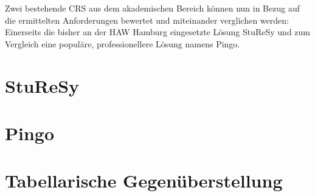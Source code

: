 Zwei bestehende CRS aus dem akademischen Bereich können nun in Bezug auf die ermittelten Anforderungen bewertet und miteinander verglichen werden: Einerseits die bisher an der HAW Hamburg eingesetzte Lösung StuReSy und zum Vergleich eine populäre, professionellere Lösung namens Pingo.

\section{StuReSy}
\label{chap:sturesy}


\newpage
\section{Pingo}
\label{chap:pingo}


\newpage
\section{Tabellarische Gegenüberstellung}
\label{chap:tabelle}
